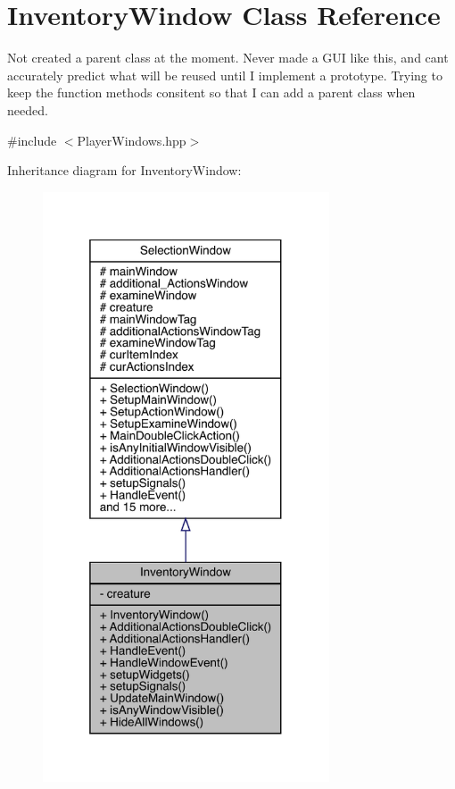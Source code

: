 \hypertarget{class_inventory_window}{}\section{Inventory\+Window Class Reference}
\label{class_inventory_window}


Not created a parent class at the moment. Never made a G\+UI like this, and can\textquotesingle{}t accurately predict what will be reused until I implement a prototype. Trying to keep the function methods consitent so that I can add a parent class when needed.  




{\ttfamily \#include $<$Player\+Windows.\+hpp$>$}



Inheritance diagram for Inventory\+Window\+:
\nopagebreak
\begin{figure}[H]
\begin{center}
\leavevmode
\includegraphics[width=241pt]{dd/d13/class_inventory_window__inherit__graph}
\end{center}
\end{figure}


